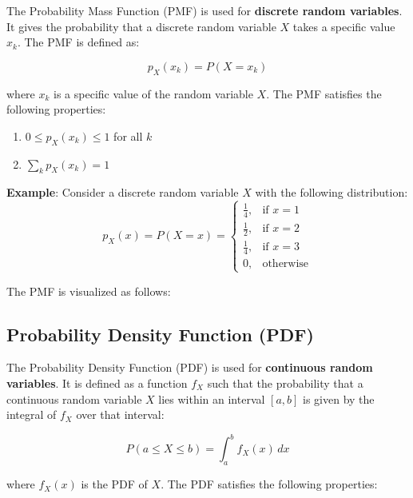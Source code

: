 \documentclass[twoside]{book}
\begin{document}
The {Probability Mass Function (PMF)} is used for \textbf{discrete random variables}. It gives the probability that a discrete random variable \( X \) takes a specific value \( x_k \). The PMF is defined as:
\begin{textbox}
\[
p_X(x_k) = P(X = x_k)
\]
\end{textbox}
where \( x_k \) is a specific value of the random variable \( X \). The PMF satisfies the following properties:

\begin{enumerate}
    \item \( 0 \leq p_X(x_k) \leq 1 \) for all \( k \)
    \item \( \sum_{k} p_X(x_k) = 1 \)
\end{enumerate}

\textbf{Example}: Consider a discrete random variable \( X \) with the following distribution:
\[
p_X(x) = P(X = x) =
\begin{cases}
\frac{1}{4}, & \text{if } x = 1 \\
\frac{1}{2}, & \text{if } x = 2 \\
\frac{1}{4}, & \text{if } x = 3 \\
0, & \text{otherwise}
\end{cases}
\]

The PMF is visualized as follows:

\begin{center}
\end{center}

\subsection{Probability Density Function (PDF)}

The {Probability Density Function (PDF)} is used for \textbf{continuous random variables}. It is defined as a function $f_X$ such that the probability that a continuous random variable \( X \) lies within an interval \( [a, b] \) is given by the integral of $f_X$ over that interval:
\begin{textbox}
\[
P(a \leq X \leq b) = \int_a^b f_X(x) \, dx
\]
\end{textbox}
where \( f_X(x) \) is the PDF of \( X \). The PDF satisfies the following properties:
\end{document}

